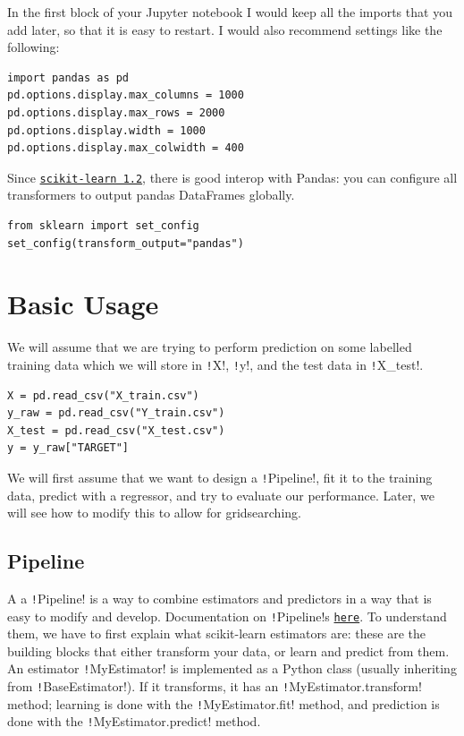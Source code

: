 \documentclass[11pt]{article}
\theoremstyle{definition}
\newcommand{\myhref}[2]{\href{#1}{\texttt{#2}}}
\begin{document}
In the first block of your Jupyter notebook I would keep all the imports that you add later, so that it is easy to restart. I would also recommend settings like the following:
\begin{verbatim}
import pandas as pd
pd.options.display.max_columns = 1000
pd.options.display.max_rows = 2000
pd.options.display.width = 1000
pd.options.display.max_colwidth = 400
\end{verbatim}
Since \myhref{https://scikit-learn.org/stable/auto_examples/release_highlights/plot_release_highlights_1_2_0.html}{scikit-learn 1.2}, there is good interop with Pandas: you can configure all transformers to output pandas DataFrames globally.
\begin{verbatim}
from sklearn import set_config
set_config(transform_output="pandas")
\end{verbatim}

\section{Basic Usage}
We will assume that we are trying to perform prediction on some labelled training data which we will store in \texttt!X!, \texttt!y!, and the test data in \texttt!X_test!.
\begin{verbatim}
X = pd.read_csv("X_train.csv") 
y_raw = pd.read_csv("Y_train.csv")  
X_test = pd.read_csv("X_test.csv")
y = y_raw["TARGET"]
\end{verbatim}

We will first assume that we want to design a \texttt!Pipeline!, fit it to the training data, predict with a regressor, and try to evaluate our performance. Later, we will see how to modify this to allow for gridsearching.

\subsection{Pipeline}
A a \texttt!Pipeline! is a way to combine estimators and predictors in a way that is easy to modify and develop. Documentation on \texttt!Pipeline!s \myhref{https://scikit-learn.org/stable/modules/compose.html\#build-a-pipeline}{here}. To understand them, we have to first explain what scikit-learn estimators are: these are the building blocks that either transform your data, or learn and predict from them. 
An estimator \texttt!MyEstimator! is implemented as a Python class (usually inheriting from \texttt!BaseEstimator!). 
If it transforms, it has an \texttt!MyEstimator.transform! method;
learning is done with the \texttt!MyEstimator.fit! method, and
prediction is done with the \texttt!MyEstimator.predict! method. 
\end{document}
